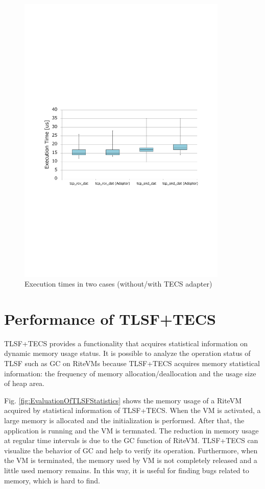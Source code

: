 \documentclass[a4j,12pt,oneside,openany,english]{jsbook}
\begin{document}
\begin{figure}[t]
    \centering
    \includegraphics[width=10cm,clip]{figure/EvaluationOfAdapter.pdf}
    \caption{Execution times in two cases (without/with TECS adapter)}
    \label{fig:EvaluationOfAdapter}
\end{figure}

\section{Performance of TLSF+TECS}

TLSF+TECS provides a functionality that acquires statistical information on dynamic memory usage status.
It is possible to analyze the operation status of TLSF such as GC on RiteVMs because TLSF+TECS acquires memory statistical information: the frequency of memory allocation/deallocation and the usage size of heap area.

Fig. \ref{fig:EvaluationOfTLSFStatistics} shows the memory usage of a RiteVM acquired by statistical information of TLSF+TECS.
When the VM is activated, a large memory is allocated and the initialization is performed.
After that, the application is running and the VM is termnated.
The reduction in memory usage at regular time intervals is due to the GC function of RiteVM.
TLSF+TECS can visualize the behavior of GC and help to verify its operation.
Furthermore, when the VM is terminated, the memory used by VM is not completely released and a little used memory remains.
In this way, it is useful for finding bugs related to memory, which is hard to find.
\end{document}
